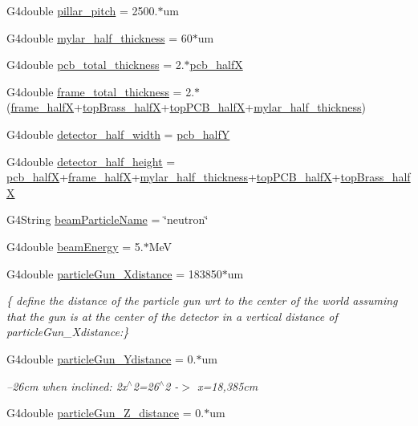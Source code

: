 \begin{DoxyCompactItemize}
G4double \hyperlink{structUMConfig_a1beecce75e7f95f04f4bc28f1bb555e7}{pillar\+\_\+pitch} = 2500.$\ast$um
\item 
G4double \hyperlink{structUMConfig_a01cc15c40820340a99b62ad488e8f389}{mylar\+\_\+half\+\_\+thickness} = 60$\ast$um
\item 
G4double \hyperlink{structUMConfig_a667115049ce41cb868af4d313aba742b}{pcb\+\_\+total\+\_\+thickness} = 2.$\ast$\hyperlink{structUMConfig_a89f67c198c9542cc4421a2dc60c52b36}{pcb\+\_\+half\+X}
\item 
G4double \hyperlink{structUMConfig_a940b4dce2ed84398b26316eeb1c1b35f}{frame\+\_\+total\+\_\+thickness} = 2.$\ast$(\hyperlink{structUMConfig_aafe2777462b266d6e826f29780f41734}{frame\+\_\+half\+X}+\hyperlink{structUMConfig_a43a19c4dafb2b14f2035307cea692735}{top\+Brass\+\_\+half\+X}+\hyperlink{structUMConfig_a11a04ed6303378bb1f6121ae786d4805}{top\+P\+C\+B\+\_\+half\+X}+\hyperlink{structUMConfig_a01cc15c40820340a99b62ad488e8f389}{mylar\+\_\+half\+\_\+thickness})
\item 
G4double \hyperlink{structUMConfig_a74bcad30686f23899c8b0326a30d95b0}{detector\+\_\+half\+\_\+width} = \hyperlink{structUMConfig_a6c1fe8140f1fd3613eb3d4b1f77ca13e}{pcb\+\_\+half\+Y}
\item 
G4double \hyperlink{structUMConfig_a7884fd0bd17cd4d9e5ed778187face90}{detector\+\_\+half\+\_\+height} = \hyperlink{structUMConfig_a89f67c198c9542cc4421a2dc60c52b36}{pcb\+\_\+half\+X}+\hyperlink{structUMConfig_aafe2777462b266d6e826f29780f41734}{frame\+\_\+half\+X}+\hyperlink{structUMConfig_a01cc15c40820340a99b62ad488e8f389}{mylar\+\_\+half\+\_\+thickness}+\hyperlink{structUMConfig_a11a04ed6303378bb1f6121ae786d4805}{top\+P\+C\+B\+\_\+half\+X}+\hyperlink{structUMConfig_a43a19c4dafb2b14f2035307cea692735}{top\+Brass\+\_\+half\+X}
\item 
G4\+String \hyperlink{structUMConfig_a74976964c0a3c1e31a73fd823e05bcb1}{beam\+Particle\+Name} = \char`\"{}neutron\char`\"{}
\item 
G4double \hyperlink{structUMConfig_ab02e67f7b40f3fab43e16420dc9ed66a}{beam\+Energy} = 5.$\ast$Me\+V
\item 
G4double \hyperlink{structUMConfig_aefea0e00593d3272310b5f9918c411b3}{particle\+Gun\+\_\+\+Xdistance} = 183850$\ast$um
\begin{DoxyCompactList}\small\item\em \{ define the distance of the particle gun wrt to the center of the world assuming that the gun is at the center of the detector in a vertical distance of particle\+Gun\+\_\+\+Xdistance\+:\} \end{DoxyCompactList}\item 
G4double \hyperlink{structUMConfig_acd052d2268fad88072f04522ebe2ad57}{particle\+Gun\+\_\+\+Ydistance} = 0.$\ast$um
\begin{DoxyCompactList}\small\item\em --26cm when inclined\+: 2x$^\wedge$2=26$^\wedge$2 -\/$>$ x=18,385cm \end{DoxyCompactList}\item 
G4double \hyperlink{structUMConfig_ac9812c1f908fee8386d07ef47c360dbb}{particle\+Gun\+\_\+\+Z\+\_\+distance} = 0.$\ast$um
\end{DoxyCompactItemize}


